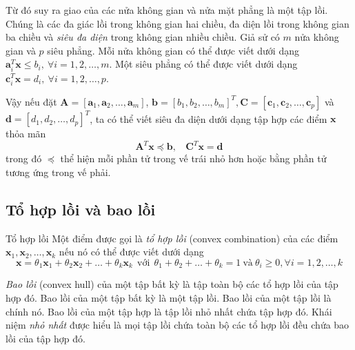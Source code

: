Từ đó suy ra giao của các nửa không gian và nửa mặt phẳng
là một tập lồi. Chúng là các đa giác lồi trong không gian hai chiều, đa
diện lồi trong không gian ba chiều và \textit{siêu đa diện} trong không gian nhiều chiều.
Giả sử có $m$ nửa không gian và $p$ siêu phẳng. Mỗi nửa không gian có thể được viết dưới dạng $\mathbf{a}_i^T\mathbf{x} \leq
b_i, ~\forall i = 1, 2, \dots, m$. Một siêu phẳng có thể được viết
dưới dạng $\mathbf{c}_i^T\mathbf{x} = d_i, ~\forall i = 1, 2, \dots, p$.

Vậy nếu đặt $\mathbf{A} = [\mathbf{a}_1, \mathbf{a}_2, \dots, \mathbf{a}_m]$,
$\mathbf{b} = [b_1, b_2, \dots, b_m]^T, \mathbf{C} = [\mathbf{c}_1,
\mathbf{c}_2, \dots, \mathbf{c}_p]$ và $\mathbf{d} = [d_1, d_2, \dots, d_p]^T$, ta
có thể viết siêu đa diện dưới dạng tập hợp các điểm $\mathbf{x}$ thỏa mãn
\begin{equation*}
\mathbf{A}^T\mathbf{x} \preceq \mathbf{b}, ~~~~  \mathbf{C}^T\mathbf{x} = \mathbf{d}
\end{equation*}
trong đó $\preceq$ thể hiện mỗi phần tử trong vế trái nhỏ
hơn hoặc bằng phần tử tương ứng trong vế phải.


\subsection{Tổ hợp lồi và bao lồi}
\begin{mydef}{Tổ hợp lồi}{}
Một điểm được gọi là \textit{tổ hợp lồi} ({convex combination}) của các
điểm $\mathbf{x}_1, \mathbf{x}_2, \dots, \mathbf{x}_k$ nếu nó có thể được viết dưới dạng
\begin{equation*}
\mathbf{x} = \theta_1 \mathbf{x}_1 + \theta_2 \mathbf{x}_2 + \dots  +
\theta_k \mathbf{x}_k ~~ \text{với} ~~ \theta_1 + \theta_2 + \dots +
\theta_k = 1 ~\text{và}~ \theta_i \geq 0, \forall i= 1, 2, \dots, k
\end{equation*}
\end{mydef}

\textit{Bao lồi} ({{convex hull}}) của một {tập bất kỳ} là tập
toàn bộ các tổ hợp lồi của tập hợp đó.
Bao lồi của một tập bất kỳ là một tập lồi.
Bao lồi của một tập lồi là chính nó. Bao lồi của một tập hợp là tập lồi {nhỏ nhất} chứa tập
hợp đó. Khái niệm {\textit{nhỏ nhất}} được hiểu là mọi tập lồi chứa toàn bộ các tổ hợp lồi đều chứa bao lồi của tập hợp đó.

